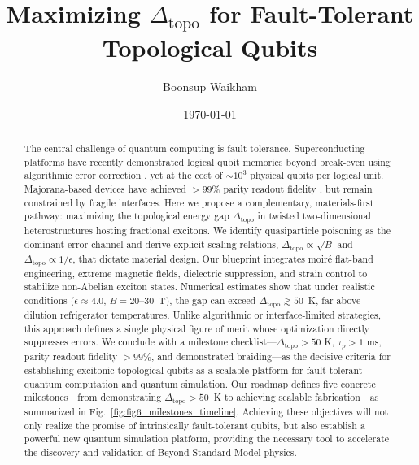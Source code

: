 \documentclass[aps,prl,twocolumn,superscriptaddress]{revtex4-2}
\begin{document}
\title{Maximizing $\Delta_{\text{topo}}$ for Fault-Tolerant Topological Qubits}

\author{Boonsup Waikham}
\date{\today}

\begin{abstract}
The central challenge of quantum computing is fault tolerance. 
Superconducting platforms have recently demonstrated logical qubit memories beyond break-even using algorithmic error correction \cite{Willow2025}, yet at the cost of $\sim 10^3$ physical qubits per logical unit. 
Majorana-based devices have achieved $>99\%$ parity readout fidelity \cite{Higginbotham2024,Frolov2025}, but remain constrained by fragile interfaces. 
Here we propose a complementary, materials-first pathway: maximizing the topological energy gap $\Delta_{\text{topo}}$ in twisted two-dimensional heterostructures hosting fractional excitons. 
We identify quasiparticle poisoning as the dominant error channel and derive explicit scaling relations, $\Delta_{\text{topo}} \propto \sqrt{B}$ and $\Delta_{\text{topo}} \propto 1/\epsilon$, that dictate material design. 
Our blueprint integrates moiré flat-band engineering, extreme magnetic fields, dielectric suppression, and strain control to stabilize non-Abelian exciton states. 
Numerical estimates show that under realistic conditions ($\epsilon \approx 4.0$, $B = 20$--30~T), the gap can exceed $\Delta_{\text{topo}} \gtrsim 50$~K, far above dilution refrigerator temperatures. 
Unlike algorithmic or interface-limited strategies, this approach defines a single physical figure of merit whose optimization directly suppresses errors. 
We conclude with a milestone checklist---$\Delta_{\text{topo}} > 50$ K, $\tau_{p} > 1$ ms, parity readout fidelity $>99\%$, and demonstrated braiding---as the decisive criteria for establishing excitonic topological qubits as a scalable platform for fault-tolerant quantum computation and quantum simulation.
Our roadmap defines five concrete milestones---from demonstrating $\Delta_{\text{topo}} > 50$~K to achieving scalable fabrication---as summarized in Fig.~\ref{fig:fig6_milestones_timeline}. 
Achieving these objectives will not only realize the promise of intrinsically fault-tolerant qubits, but also establish a powerful new quantum simulation platform, providing the necessary tool to accelerate the discovery and validation of Beyond-Standard-Model physics.

\end{abstract}
\end{document}
